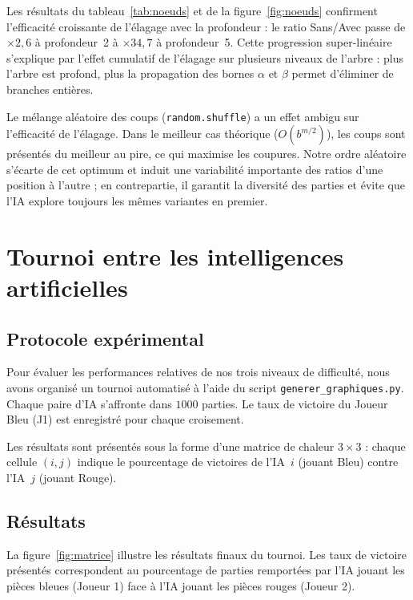 \documentclass[12pt, a4paper]{article}
\begin{document}
Les résultats du tableau~\ref{tab:noeuds} et de la figure~\ref{fig:noeuds} confirment
l'efficacité croissante de l'élagage avec la profondeur : le ratio Sans/Avec passe de
$\times2{,}6$ à profondeur~2 à $\times34{,}7$ à profondeur~5. Cette progression super-linéaire
s'explique par l'effet cumulatif de l'élagage sur plusieurs niveaux de l'arbre : plus l'arbre
est profond, plus la propagation des bornes $\alpha$ et $\beta$ permet d'éliminer de branches
entières.

Le mélange aléatoire des coups (\texttt{random.shuffle}) a un effet ambigu sur l'efficacité
de l'élagage. Dans le meilleur cas théorique ($O(b^{m/2})$), les coups sont présentés du
meilleur au pire, ce qui maximise les coupures. Notre ordre aléatoire s'écarte de cet optimum
et induit une variabilité importante des ratios d'une position à l'autre ; en contrepartie, il
garantit la diversité des parties et évite que l'IA explore toujours les mêmes variantes en
premier.

\section{Tournoi entre les intelligences artificielles}
\label{sec:tournoi}

\subsection{Protocole expérimental}

Pour évaluer les performances relatives de nos trois niveaux de difficulté, nous avons organisé
un tournoi automatisé à l'aide du script \texttt{generer\_graphiques.py}. Chaque paire d'IA
s'affronte dans $1000$ parties. Le taux de victoire du Joueur Bleu (J1) est enregistré pour
chaque croisement.

Les résultats sont présentés sous la forme d'une matrice de chaleur $3 \times 3$ : chaque
cellule $(i, j)$ indique le pourcentage de victoires de l'IA~$i$ (jouant Bleu) contre
l'IA~$j$ (jouant Rouge).

\subsection{Résultats}

La figure~\ref{fig:matrice} illustre les résultats finaux du tournoi. Les taux de victoire présentés correspondent au pourcentage de parties remportées par l'IA jouant les pièces bleues (Joueur 1) face à l'IA jouant les pièces rouges (Joueur 2).
\end{document}
